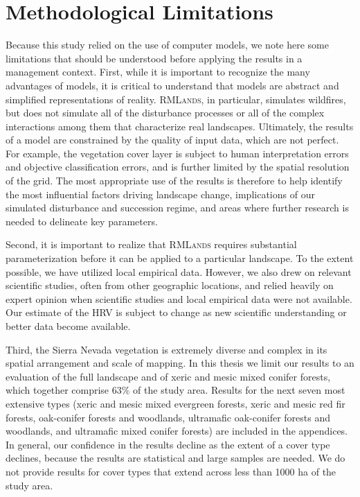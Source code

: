 \section{Methodological Limitations}
Because this study relied on the use of computer models, we note here some limitations that should be understood before applying the results in a management context. First, while it is important to recognize the many advantages of models, it is critical to understand that models are abstract and simplified representations of reality. \textsc{RMLands}, in particular, simulates wildfires, but does not simulate all of the disturbance processes or all of the complex interactions among them that characterize real landscapes. Ultimately, the results of a model are constrained by the quality of input data, which are not perfect. For example, the vegetation cover layer is subject to human interpretation errors and objective classification errors, and is further limited by the spatial resolution of the grid. The most appropriate use of the results is therefore to help identify the most influential factors driving landscape change, implications of our simulated disturbance and succession regime, and areas where further research is needed to delineate key parameters.

Second, it is important to realize that \textsc{RMLands} requires substantial parameterization before it can be applied to a particular landscape. To the extent possible, we have utilized local empirical data. However, we also drew on relevant scientific studies, often from other geographic locations, and relied heavily on expert opinion when scientific studies and local empirical data were not available. Our estimate of the HRV is subject to change as new scientific understanding or better data become available.

Third, the Sierra Nevada vegetation is extremely diverse and complex in its spatial arrangement and scale of mapping. In this thesis we limit our results to an evaluation of the full landscape and of xeric and mesic mixed conifer forests, which together comprise 63\% of the study area. Results for the next seven most extensive types (xeric and mesic mixed evergreen forests, xeric and mesic red fir forests, oak-conifer forests and woodlands, ultramafic oak-conifer forests and woodlands, and ultramafic mixed conifer forests) are included in the appendices. In general, our confidence in the results decline as the extent of a cover type declines, because the results are statistical and large samples are needed. We do not provide results for cover types that extend across less than 1000 ha of the study area.

